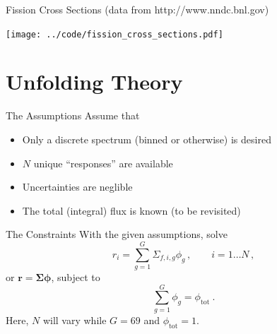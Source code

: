 \documentclass[fleqn]{beamer}
\begin{document}
    
    \begin{frame}{Fission Cross Sections (data from http://www.nndc.bnl.gov)}
         \begin{center}
             \texttt{[image: ../code/fission\_cross\_sections.pdf]}
         \end{center}
    \end{frame}
    
    
    \section{Unfolding Theory}
    
    \begin{frame}{The Assumptions}
      Assume that 
      \begin{itemize}
       \item Only a discrete spectrum (binned or otherwise) is desired
       \item $N$ unique ``responses'' are available
       \item Uncertainties are neglible
       \item The total (integral) flux is known (to be revisited)
      \end{itemize}
    \end{frame}  
    
    
    \begin{frame}{The Constraints}
      With the given assumptions, solve
      \begin{equation}
            r_i = \sum_{g=1}^{G} \Sigma_{f,i,g}  \phi_g\, , 
              \qquad i = 1 \ldots N \, ,
          \label{eq:response}
      \end{equation}     
      or $\mathbf{r} = \bm{\Sigma} \bm{\phi}$, subject to 
      \begin{equation}
            \sum^G_{g=1}{\phi_g} = \phi_{\textrm{tot}} \ .
      \end{equation}
      Here, $N$ will vary while $G = 69$ and $\phi_{\textrm{tot}} = 1$.
    \end{frame}
\end{document}
